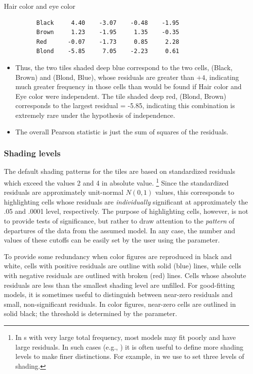 \begin{Example}[haireye2a]{Hair color and eye color}
\begin{itemize}
\begin{verbatim}
      Black     4.40    -3.07    -0.48    -1.95
      Brown     1.23    -1.95     1.35    -0.35
      Red      -0.07    -1.73     0.85     2.28
      Blond    -5.85     7.05    -2.23     0.61
\end{verbatim}
\item Thus, the two tiles shaded deep blue correspond to the two
cells, (Black, Brown) and (Blond, Blue), whose residuals are
greater than $+4$, indicating much greater frequency in those
cells than would be found if Hair color and Eye color were
independent.
The tile shaded deep red, (Blond, Brown)
corresponds to the largest residual = -5.85, indicating this combination
is extremely rare under the hypothesis of independence.
\item The overall Pearson \chisq{} statistic is just the
sum of squares of the residuals.
\end{itemize}
\end{Example}

\subsubsection{Shading levels}

The default shading patterns for the tiles are based on standardized
residuals which exceed the values 2 and 4 in absolute value.%
\footnote{In \Dset{}s with very large total frequency,
most models may fit poorly and have large residuals.
In such cases (e.g., ) it is often useful to define
more shading levels to make finer distinctions.  For example,
in  we use  to set
three levels of shading.}
Since the standardized residuals are approximately unit-normal $N(0,1)$
values,  this corresponds to highlighting cells whose
residuals are \emph{individually} significant at approximately
the .05 and .0001 level, respectively.
The purpose of highlighting cells, however, is not to provide tests
of significance, but rather to draw attention to the \emph{pattern}
of departures of the data from the assumed model.
In any case, 
the number and values of
these cutoffs can be easily set by the user using the 
parameter.

To provide some redundancy when color figures are reproduced in 
black and white, cells with positive residuals are outline with solid
(blue) lines, while cells with negative residuals are outlined with broken
(red) lines.
Cells whose absolute residuals are less than the smallest shading level
are unfilled.  For good-fitting models, it is sometimes useful to distinguish
between near-zero residuals and small, non-significant residuals.
In color figures, near-zero cells are outlined in solid black;
the threshold is determined by the  parameter.

